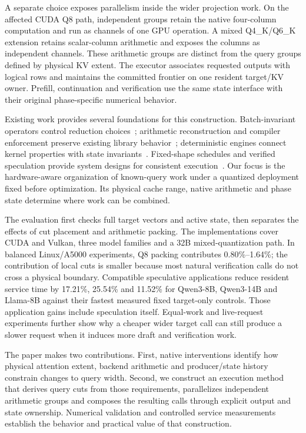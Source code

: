 A separate choice exposes parallelism inside the wider projection work. On the affected CUDA Q8 path, independent groups retain the native four-column computation and run as channels of one GPU operation. A mixed Q4\_K/Q6\_K extension retains scalar-column arithmetic and exposes the columns as independent channels. These arithmetic groups are distinct from the query groups defined by physical KV extent. The executor associates requested outputs with logical rows and maintains the committed frontier on one resident target/KV owner. Prefill, continuation and verification use the same state interface with their original phase-specific numerical behavior.

Existing work provides several foundations for this construction. Batch-invariant operators control reduction choices~\cite{thinkingmachines}; arithmetic reconstruction and compiler enforcement preserve existing library behavior~\cite{taming}; deterministic engines connect kernel properties with state invariants~\cite{vosti}. Fixed-shape schedules and verified speculation provide system designs for consistent execution~\cite{corun,llm42}. Our focus is the hardware-aware organization of known-query work under a quantized deployment fixed before optimization. Its physical cache range, native arithmetic and phase state determine where work can be combined.

The evaluation first checks full target vectors and active state, then separates the effects of cut placement and arithmetic packing. The implementations cover CUDA and Vulkan, three model families and a 32B mixed-quantization path. In balanced Linux/A5000 experiments, Q8 packing contributes 0.80\%--1.64\%; the contribution of local cuts is smaller because most natural verification calls do not cross a physical boundary. Compatible speculative applications reduce resident service time by 17.21\%, 25.54\% and 11.52\% for Qwen3-8B, Qwen3-14B and Llama-8B against their fastest measured fixed target-only controls. Those application gains include speculation itself. Equal-work and live-request experiments further show why a cheaper wider target call can still produce a slower request when it induces more draft and verification work.

The paper makes two contributions. First, native interventions identify how physical attention extent, backend arithmetic and producer/state history constrain changes to query width. Second, we construct an execution method that derives query cuts from those requirements, parallelizes independent arithmetic groups and composes the resulting calls through explicit output and state ownership. Numerical validation and controlled service measurements establish the behavior and practical value of that construction.
